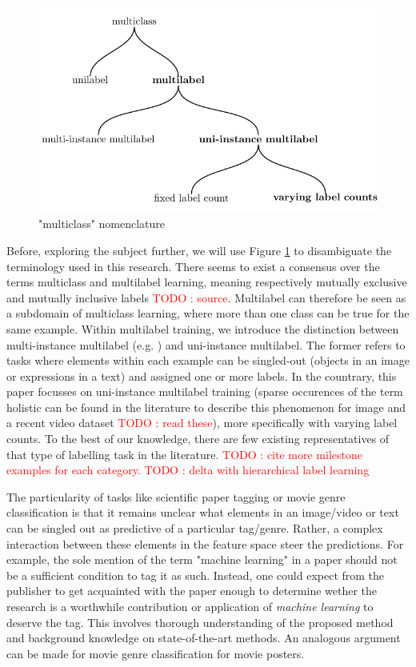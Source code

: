 \documentclass[sigconf,natbib,screen=true,review=true,anonymous]{acmart}
\newcommand\todo[1]{\textcolor{red}{TODO : #1}}
\begin{document}
\begin{figure}[htbp]
\centering
\includegraphics[width=.9\linewidth]{./tree/Tree.pdf}
\caption{\label{fig:tree}
"multiclass" nomenclature}
\end{figure}

Before, exploring the subject further, we will use Figure \ref{fig:tree} to disambiguate the terminology used in this research. There seems to exist a consensus over the terms multiclass and multilabel learning, meaning respectively mutually exclusive and mutually inclusive labels \todo{source}. Multilabel can therefore be seen as a subdomain of multiclass learning, where more than one class can be true for the same example. Within multilabel training, we introduce the distinction between multi-instance multilabel (e.g. \cite{multiInstance}) and uni-instance multilabel. The former refers to tasks where elements within each example can be singled-out (objects in an image or expressions in a text) and assigned one or more labels. In the countrary, this paper focusses on uni-instance multilabel training (sparse occurences of the term holistic can be found in the literature to describe this phenomenon for image \cite{holisticImageDescriptors,holisticLungs} and a recent video dataset \cite{holisticVideoData} \todo{read these}), more specifically with varying label counts. To the best of our knowledge, there are few existing representatives of that type of labelling task in the literature. \todo{cite more milestone examples for each category.} \todo{delta with hierarchical label learning}

The particularity of tasks like scientific paper tagging or movie genre classification is that it remains unclear what elements in an image/video or text can be singled out as predictive of a particular tag/genre. Rather, a complex interaction between these elements in the feature space steer the predictions. For example, the sole mention of the term "machine learning" in a paper should not be a sufficient condition to tag it as such. Instead, one could expect from the publisher to get acquainted with the paper enough to determine wether the research is a worthwhile contribution or application of \emph{machine learning} to deserve the tag. This involves thorough understanding of the proposed method and background knowledge on state-of-the-art methods. An analogous argument can be made for movie genre classification for movie posters.
\end{document}
